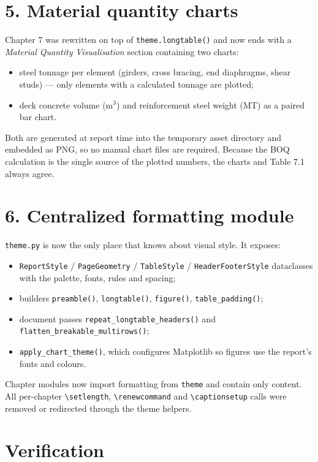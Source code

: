 \documentclass[11pt,a4paper]{article}
\newcommand{\code}[1]{\texttt{\small #1}}
\begin{document}
\section{5. Material quantity charts}

Chapter 7 was rewritten on top of \code{theme.longtable()} and now ends with a
\emph{Material Quantity Visualisation} section containing two charts:
\begin{itemize}
  \item steel tonnage per element (girders, cross bracing, end diaphragms, shear
        studs) --- only elements with a calculated tonnage are plotted;
  \item deck concrete volume ($\mathrm{m}^3$) and reinforcement steel weight (MT)
        as a paired bar chart.
\end{itemize}
Both are generated at report time into the temporary asset directory and embedded
as PNG, so no manual chart files are required. Because the BOQ calculation is the
single source of the plotted numbers, the charts and Table 7.1 always agree.

\section{6. Centralized formatting module}

\code{theme.py} is now the only place that knows about visual style. It exposes:
\begin{itemize}
  \item \code{ReportStyle} / \code{PageGeometry} / \code{TableStyle} /
        \code{HeaderFooterStyle} dataclasses with the palette, fonts, rules and
        spacing;
  \item builders \code{preamble()}, \code{longtable()}, \code{figure()},
        \code{table\_padding()};
  \item document passes \code{repeat\_longtable\_headers()} and
        \code{flatten\_breakable\_multirows()};
  \item \code{apply\_chart\_theme()}, which configures Matplotlib so figures use the
        report's fonts and colours.
\end{itemize}
Chapter modules now import formatting from \code{theme} and contain only content.
All per-chapter \code{\textbackslash setlength}, \code{\textbackslash renewcommand}
and \code{\textbackslash captionsetup} calls were removed or redirected through the
theme helpers.

\section{Verification}
\end{document}
